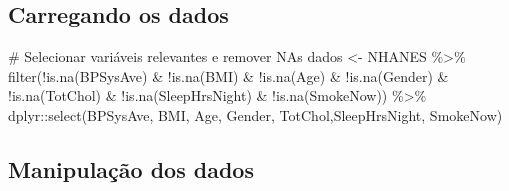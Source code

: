 \documentclass[
  letterpaper,
  DIV=11,
  numbers=noendperiod]{scrartcl}
\newenvironment{Shaded}{\begin{snugshade}}{\end{snugshade}}
\newcommand{\CommentTok}[1]{\textcolor[rgb]{0.37,0.37,0.37}{#1}}
\newcommand{\FunctionTok}[1]{\textcolor[rgb]{0.28,0.35,0.67}{#1}}
\newcommand{\NormalTok}[1]{\textcolor[rgb]{0.00,0.23,0.31}{#1}}
\newcommand{\OtherTok}[1]{\textcolor[rgb]{0.00,0.23,0.31}{#1}}
\newcommand{\SpecialCharTok}[1]{\textcolor[rgb]{0.37,0.37,0.37}{#1}}
\newcommand{\StringTok}[1]{\textcolor[rgb]{0.13,0.47,0.30}{#1}}
\begin{document}
\subsection{Carregando os dados}\label{carregando-os-dados}

\begin{Shaded}
\begin{Highlighting}[]
\CommentTok{\# Selecionar variáveis relevantes e remover NAs}
\NormalTok{dados }\OtherTok{\textless{}{-}}\NormalTok{ NHANES }\SpecialCharTok{\%\textgreater{}\%}
  \FunctionTok{filter}\NormalTok{(}\SpecialCharTok{!}\FunctionTok{is.na}\NormalTok{(BPSysAve) }\SpecialCharTok{\&} \SpecialCharTok{!}\FunctionTok{is.na}\NormalTok{(BMI) }\SpecialCharTok{\&} \SpecialCharTok{!}\FunctionTok{is.na}\NormalTok{(Age) }\SpecialCharTok{\&} \SpecialCharTok{!}\FunctionTok{is.na}\NormalTok{(Gender) }\SpecialCharTok{\&} 
           \SpecialCharTok{!}\FunctionTok{is.na}\NormalTok{(TotChol) }\SpecialCharTok{\&} \SpecialCharTok{!}\FunctionTok{is.na}\NormalTok{(SleepHrsNight) }\SpecialCharTok{\&} \SpecialCharTok{!}\FunctionTok{is.na}\NormalTok{(SmokeNow)) }\SpecialCharTok{\%\textgreater{}\%}
\NormalTok{  dplyr}\SpecialCharTok{::}\FunctionTok{select}\NormalTok{(BPSysAve, BMI, Age, Gender, TotChol,SleepHrsNight,  SmokeNow)}
\end{Highlighting}
\end{Shaded}

\subsection{Manipulação dos dados}\label{manipulauxe7uxe3o-dos-dados}

\begin{Shaded}
\end{Shaded}
\end{document}
